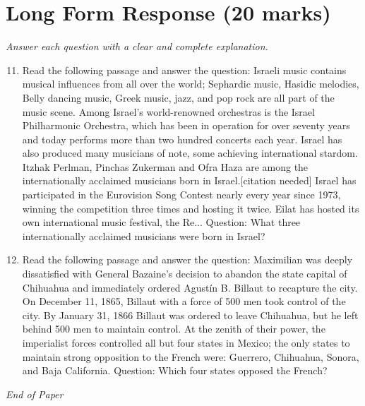 \documentclass[12pt]{article}
\begin{document}
\section*{Long Form Response (20 marks)}
\textit{Answer each question with a clear and complete explanation.}
\begin{enumerate}[label=\arabic*.]
\setcounter{enumi}{10}
\item Read the following passage and answer the question: Israeli music contains musical influences from all over the world; Sephardic music, Hasidic melodies, Belly dancing music, Greek music, jazz, and pop rock are all part of the music scene. Among Israel's world-renowned orchestras is the Israel Philharmonic Orchestra, which has been in operation for over seventy years and today performs more than two hundred concerts each year. Israel has also produced many musicians of note, some achieving international stardom. Itzhak Perlman, Pinchas Zukerman and Ofra Haza are among the internationally acclaimed musicians born in Israel.[citation needed] Israel has participated in the Eurovision Song Contest nearly every year since 1973, winning the competition three times and hosting it twice. Eilat has hosted its own international music festival, the Re... Question: What three internationally acclaimed musicians were born in Israel?
\item Read the following passage and answer the question: Maximilian was deeply dissatisfied with General Bazaine's decision to abandon the state capital of Chihuahua and immediately ordered Agustín B. Billaut to recapture the city. On December 11, 1865, Billaut with a force of 500 men took control of the city. By January 31, 1866 Billaut was ordered to leave Chihuahua, but he left behind 500 men to maintain control. At the zenith of their power, the imperialist forces controlled all but four states in Mexico; the only states to maintain strong opposition to the French were: Guerrero, Chihuahua, Sonora, and Baja California. Question: Which four states opposed the French?
\end{enumerate}

\vfill
\noindent\textit{End of Paper}
\end{document}
